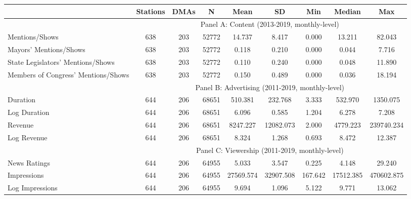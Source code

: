 {\def \sym#1{\ifmmode^{#1}\else\(^{#1}\)\fi} \begin{tabular}{l*{1}{cccccccc}} \toprule
                    &  Stations&      DMAs&           N&        Mean&          SD&         Min&      Median&         Max\\
\midrule \ & \multicolumn{8}{c}{Panel A: Content (2013-2019, monthly-level)} \\\cmidrule(lr){2-9}
Mentions/Shows      &     638       &      203      &       52772&      14.737&       8.417&       0.000&      13.211&      82.043\\
Mayors' Mentions/Shows&   638         &        203    &       52772&       0.118&       0.210&       0.000&       0.044&       7.716\\
State Legislators' Mentions/Shows&     638       &       203     &       52772&       0.110&       0.240&       0.000&       0.048&      11.890\\
Members of Congress' Mentions/Shows&      638      &     203       &       52772&       0.150&       0.489&       0.000&       0.036&      18.194\\
\midrule \ & \multicolumn{8}{c}{Panel B: Advertising (2011-2019, monthly-level)} \\\cmidrule(lr){2-9}
Duration            &      644      &     206       &       68651&     510.381&     232.768&       3.333&     532.970&    1350.075\\
Log Duration        &      644      &     206       &       68651&       6.096&       0.585&       1.204&       6.278&       7.208\\
Revenue             &      644      &    206        &       68651&    8247.227&   12082.073&       2.000&    4779.223&  239740.234\\
Log Revenue         &      644      &    206        &       68651&       8.324&       1.268&       0.693&       8.472&      12.387\\
\midrule \ & \multicolumn{8}{c}{Panel C: Viewership (2011-2019, monthly-level)} \\\cmidrule(lr){2-9}
News Ratings        &      644      &   206         &       64955&       5.033&       3.547&       0.225&       4.148&      29.240\\
Impressions         &      644      &   206         &       64955&   27569.574&   32907.508&     167.642&   17512.385&  470602.875\\
Log Impressions     &      644      &   206         &       64955&       9.694&       1.096&       5.122&       9.771&      13.062\\
\bottomrule \end{tabular}}
